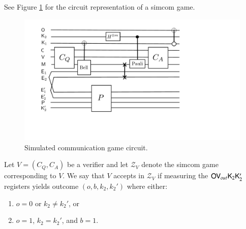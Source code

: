 \noindent See Figure \ref{fig:simcom} for the circuit representation of a simcom game.

\begin{figure}[H]
\begin{center}
\includegraphics[width=5in]{graphics/simcom.pdf}
\end{center}
\caption{Simulated communication game circuit.}
\label{fig:simcom}
\end{figure}

Let $V = (C_Q,C_A)$ be a verifier and let $\mathscr{Z}_V$ denote the simcom game corresponding to $V$. We say that $V$ accepts in $\mathscr{Z}_V$ if measuring the ${\mathsf{O}} {\mathsf{V}}_{out} {\mathsf{K}}_2 {\mathsf{K}}_2'$ registers yields outcome $(o,b,k_2,k_2')$ where either:
\begin{enumerate}
	\item $o = 0$ or $k_2 \neq k_2'$, or
	\item $o = 1$, $k_2 = k_2'$, and $b = 1$.
\end{enumerate}


